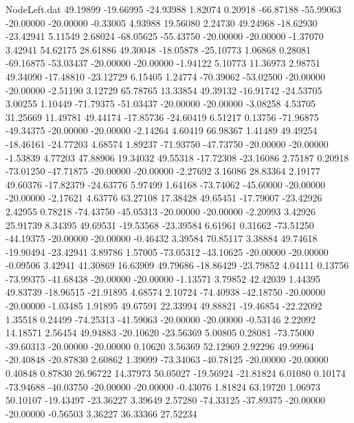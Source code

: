 \begin{filecontents}{NodeLeft.dat}
  49.19899  -19.66995  -24.93988     1.82074    0.20918  -66.87188  -55.99063  -20.00000  -20.00000   -0.33005    4.93988   19.56080    2.24730
  49.24968  -18.62930  -23.42941     5.11549    2.68024  -68.05625  -55.43750  -20.00000  -20.00000   -1.37070    3.42941   54.62175   28.61886
  49.30048  -18.05878  -25.10773     1.06868    0.28081  -69.16875  -53.03437  -20.00000  -20.00000   -1.94122    5.10773   11.36973    2.98751
  49.34090  -17.48810  -23.12729     6.15405    1.24774  -70.39062  -53.02500  -20.00000  -20.00000   -2.51190    3.12729   65.78765   13.33854
  49.39132  -16.91742  -24.53705     3.00255    1.10449  -71.79375  -51.03437  -20.00000  -20.00000   -3.08258    4.53705   31.25669   11.49781
  49.44174  -17.85736  -24.60419     6.51217    0.13756  -71.96875  -49.34375  -20.00000  -20.00000   -2.14264    4.60419   66.98367    1.41489
  49.49254  -18.46161  -24.77203     4.68574    1.89237  -71.93750  -47.73750  -20.00000  -20.00000   -1.53839    4.77203   47.88906   19.34032
  49.55318  -17.72308  -23.16086     2.75187    0.20918  -73.01250  -47.71875  -20.00000  -20.00000   -2.27692    3.16086   28.83364    2.19177
  49.60376  -17.82379  -24.63776     5.97499    1.64168  -73.74062  -45.60000  -20.00000  -20.00000   -2.17621    4.63776   63.27108   17.38428
  49.65451  -17.79007  -23.42926     2.42955    0.78218  -74.43750  -45.05313  -20.00000  -20.00000   -2.20993    3.42926   25.91739    8.34395
  49.69531  -19.53568  -23.39584     6.61961    0.31662  -73.51250  -44.19375  -20.00000  -20.00000   -0.46432    3.39584   70.85117    3.38884
  49.74618  -19.90494  -23.42941     3.89786    1.57005  -73.05312  -43.10625  -20.00000  -20.00000   -0.09506    3.42941   41.30869   16.63909
  49.79686  -18.86429  -23.79852     4.04111    0.13756  -73.99375  -41.68438  -20.00000  -20.00000   -1.13571    3.79852   42.42039    1.44395
  49.83739  -18.96515  -21.91895     4.68574    2.10724  -74.40938  -42.18750  -20.00000  -20.00000   -1.03485    1.91895   49.67591   22.33994
  49.88821  -19.46854  -22.22092     1.35518    0.24499  -74.25313  -41.59063  -20.00000  -20.00000   -0.53146    2.22092   14.18571    2.56454
  49.94883  -20.10620  -23.56369     5.00805    0.28081  -73.75000  -39.60313  -20.00000  -20.00000    0.10620    3.56369   52.12969    2.92296
  49.99964  -20.40848  -20.87830     2.60862    1.39099  -73.34063  -40.78125  -20.00000  -20.00000    0.40848    0.87830   26.96722   14.37973
  50.05027  -19.56924  -21.81824     6.01080    0.10174  -73.94688  -40.03750  -20.00000  -20.00000   -0.43076    1.81824   63.19720    1.06973
  50.10107  -19.43497  -23.36227     3.39649    2.57280  -74.33125  -37.89375  -20.00000  -20.00000   -0.56503    3.36227   36.33366   27.52234

\end{filecontents}
